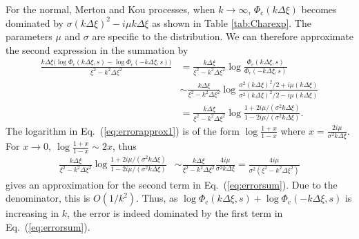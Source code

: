 \documentclass[11pt,a4paper]{article}
\begin{document}
For the normal, Merton and Kou processes, when $k\rightarrow\infty$, $\Phi_\mathrm{c}(k\Delta\xi)$ becomes dominated by $\sigma(k\Delta\xi)^2-i\mu k\Delta\xi$ as shown in Table \ref{tab:Charexp}. The parameters $\mu$ and $\sigma$ are specific to the distribution. We can therefore approximate the second expression in the summation by
\begin{align}
\frac{k\Delta\xi \big(\log \Phi_{\mathrm{c}}(k\Delta\xi,s)-\log \Phi_{\mathrm{c}}(-k\Delta\xi,s)\big)}{\xi^2 -k^2 \Delta\xi^2}
&= \frac{k\Delta\xi}{\xi^2 -k^2 \Delta\xi^2} \log \frac{\Phi_{\mathrm{c}}(k\Delta\xi,s)}{\Phi_{\mathrm{c}}(-k\Delta\xi,s)}\nonumber\\
&\sim\frac{k\Delta\xi}{{\xi^2-k^2 \Delta\xi^2}}\log\frac{\sigma^2(k\Delta\xi)^2/2+i\mu(k\Delta\xi)}{\sigma^2(k\Delta\xi)^2/2 -i\mu(k\Delta\xi)}\nonumber\\
&= \frac{k\Delta\xi}{{\xi^2-k^2 \Delta\xi^2}}\log\frac{1+2i\mu/(\sigma^2 k\Delta\xi)}{1-2i\mu/(\sigma^2 k\Delta\xi)}.\label{eq:errorapprox1}
\end{align}
The logarithm in Eq.~(\ref{eq:errorapprox1}) is of the form $\log\frac{1+x}{1-x}$ where $x=\frac{2i\mu}{\sigma^2k\Delta \xi}$. For $x\rightarrow0,\ \log\frac{1+x}{1-x}\sim2x$, thus %
\begin{align}
\frac{k\Delta\xi}{{\xi^{2}-k^{2} \Delta\xi ^{2}}}\log\frac{1+2i\mu/(\sigma^2 k\Delta\xi)}{1-2i\mu/(\sigma^2 k\Delta\xi)}&\sim\frac{k\Delta\xi}{{\xi^{2}-k^{2} \Delta\xi ^{2}}}\frac{4i\mu}{\sigma^2k\Delta \xi}=\frac{4i\mu}{\sigma^2({\xi^{2}-k^{2} \Delta\xi ^{2}})}
\end{align}
gives an approximation for the second term in Eq.~(\ref{eq:errorsum}). Due to the denominator, this is $O(1/k^2)$. Thus, as $\log \Phi_{\mathrm{c}}(k\Delta\xi,s)\!+\!\log \Phi_{\mathrm{c}}(-k\Delta\xi,s)$ is increasing in $k$, the error is indeed dominated by the first term in Eq.~(\ref{eq:errorsum}).
\end{document}
